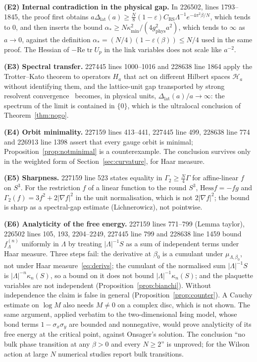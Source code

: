 \documentclass[aps,prd,twocolumn,superscriptaddress,nofootinbib,floatfix]{revtex4-2}
\theoremstyle{definition}
\theoremstyle{remark}
\DeclareMathOperator{\Tr}{tr}
\newcommand{\cH}{\mathcal{H}}
\newcommand{\Dlat}{\Delta_{\mathrm{lat}}}
\begin{document}
\textbf{(E2) Internal contradiction in the physical gap.} In 226502,
lines 1793--1845, the proof first obtains
$a\Dlat(a)\ge\tfrac N8(1-\varepsilon)C_{\mathrm{RS}}\Lambda^{-1}e^{-4\pi^2\beta/N}$,
which tends to $0$, and then inserts the bound
$\alpha_*\ge N\kappa_{\min}^2/(4g_{\mathrm{phys}}^2a^2)$, which tends to
$\infty$ as $a\to0$, against the definition
$\alpha_*=(N/4)(1-\varepsilon(\beta))\le N/4$ used in the same proof. The
Hessian of $-\mathrm{Re}\Tr U_p$ in the link variables does not scale like
$a^{-2}$.

\textbf{(E3) Spectral transfer.} 227445 lines 1000--1016 and 228638
line 1864 apply the Trotter--Kato theorem to operators $H_a$ that act on
different Hilbert spaces $\cH_a$ without identifying them, and the
lattice-unit gap transported by strong resolvent convergence~\cite{RS80}
becomes, in physical units, $\Dlat(a)/a\to\infty$: the spectrum of the
limit is contained in $\{0\}$, which is the ultralocal conclusion of
Theorem~\ref{thm:nogo}.

\textbf{(E4) Orbit minimality.} 227159 lines 413--441, 227445 line 499,
228638 line 774 and 226913 line 1398 assert that every gauge orbit is
minimal; Proposition~\ref{prop:notminimal} is a counterexample. The
conclusion survives only in the weighted form of
Section~\ref{sec:curvature}, for Haar measure.

\textbf{(E5) Sharpness.} 227159 line 523 states equality in
$\Gamma_2\ge\tfrac N4\Gamma$ for affine-linear $f$ on $S^3$. For the
restriction $f$ of a linear function to the round $S^3$,
$\mathrm{Hess}f=-fg$ and $\Gamma_2(f)=3f^2+2|\nabla f|^2$ in the unit
normalisation, which is not $2|\nabla f|^2$; the bound is sharp as a
spectral-gap estimate (Lichnerowicz), not pointwise.

\textbf{(E6) Analyticity of the free energy.} 227159 lines 771--799
(Lemma taylor), 226502 lines 105, 193, 2204--2249, 227445 line 799 and
228638 line 1459 bound $f^{(n)}_\Lambda$ uniformly in $\Lambda$ by treating
$|\Lambda|^{-1}S$ as a sum of independent terms under Haar measure. Three
steps fail: the derivative at $\beta_0$ is a cumulant under
$\mu_{\Lambda,\beta_0}$, not under Haar measure~\eqref{eq:derivs}; the
cumulant of the normalised sum $|\Lambda|^{-1}S$ is
$|\Lambda|^{-n}\kappa_n(S)$, so a bound on it does not bound
$|\Lambda|^{-1}\kappa_n(S)$; and the plaquette variables are not
independent (Proposition~\ref{prop:bianchi}). Without independence the
claim is false in general (Proposition~\ref{prop:counter}). A Cauchy
estimate on $\log M$ also needs $M\ne0$ on a complex disc, which is not
shown. The same argument, applied verbatim to the two-dimensional Ising
model, whose bond terms $1-\sigma_x\sigma_y$ are bounded and nonnegative,
would prove analyticity of its free energy at the critical point, against
Onsager's solution. The conclusion ``no bulk phase transition at any
$\beta>0$ and every $N\ge2$'' is unproved; for the Wilson action at large
$N$ numerical studies report bulk transitions.
\end{document}
